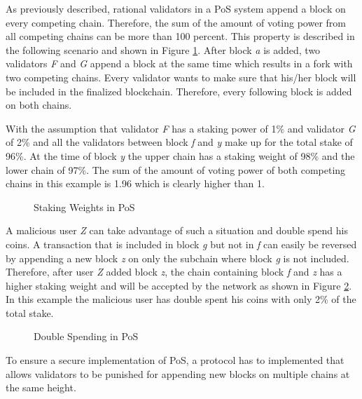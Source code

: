 As previously described, rational validators in a PoS system append a block on every competing chain. Therefore, the sum of the amount of voting power from all competing chains can be more than 100 percent. This property is described in the following scenario and shown in Figure \ref{pos_staking_weights}. After block \textit{a} is added, two validators \textit{F} and \textit{G} append a block at the same time which results in a fork with two competing chains. Every validator wants to make sure that his/her block will be included in the finalized blockchain. Therefore, every following block is added on both chains. 

With the assumption that validator \textit{F} has a staking power of 1\% and validator \textit{G} of 2\% and all the validators between block \textit{f} and \textit{y} make up for the total stake of 96\%. At the time of block \textit{y} the upper chain has a staking weight of 98\% and the lower chain of 97\%. The sum of the amount of voting power of both competing chains in this example is 1.96 which is clearly higher than 1.

\begin{figure}[H]
	\begin{center}
		
	\end{center}
	\caption{Staking Weights in PoS \cite{ethereum_faq}}
	\label{pos_staking_weights}
\end{figure}

A malicious user \textit{Z} can take advantage of such a situation and double spend his coins. A transaction that is included in block \textit{g} but not in \textit{f} can easily be reversed by appending a new block \textit{z} on only the subchain where block \textit{g} is not included. Therefore, after user \textit{Z} added block \textit{z}, the chain containing block \textit{f} and \textit{z} has a higher staking weight and will be accepted by the network as shown in Figure \ref{pos_double_spending}. In this example the malicious user has double spent his coins with only 2\% of the total stake.

\begin{figure}[H]
	\begin{center}
		
	\end{center}
	\caption{Double Spending in PoS \cite{ethereum_faq}}
	\label{pos_double_spending}
\end{figure}

To ensure a secure implementation of PoS, a protocol has to implemented that allows validators to be punished for appending new blocks on multiple chains at the same height.

